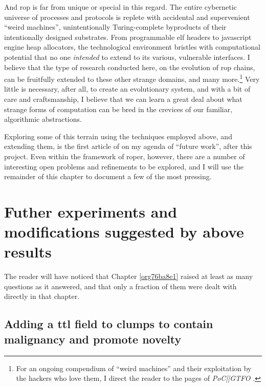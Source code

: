 \documentclass[12pt,glossary]{dalthesis}
\begin{document}
And \gls{rop} is far from unique or special in this regard. The entire cybernetic
universe of processes and protocols is replete with accidental and supervenient
``weird machines'', unintentionally Turing-complete byproducts of their intentionally
designed substrates. From programmable \gls{elf} headers to javascript engine heap
allocators, the technological environment bristles with computational potential
that no one \emph{intended} to extend to its various, vulnerable interfaces. I believe
that the type of research conducted here, on the evolution of \gls{rop} chains, can
be fruitfully extended to these other strange domains, and many more.\footnote{For an ongoing compendium of ``weird machines'' and their exploitation by the
  hackers who love them, I direct the reader to the pages of \emph{PoC||GTFO}
  \cite{pocorgtfo}.} Very little
is necessary, after all, to create an evolutionary system, and with a bit of care
and craftsmanship, I believe that we can learn a great deal about what strange
forms of computation can be bred in the crevices of our familiar, algorithmic
abstractions. 

Exploring some of this terrain using the techniques employed above, and
extending them, is the first article of on my agenda of ``future work'',
after this project. Even within the framework of \gls{roper}, however, there
are a number of interesting open problems and refinements to be explored,
and I will use the remainder of this chapter to document a few of the most
pressing.


\section{Futher experiments and modifications suggested by above results}
\label{sec:org2be0405}

The reader will have noticed that Chapter \ref{org76ba8e1} raised at least
as many questions as it answered, and that only a fraction of them were dealt
with directly in that chapter. 

\subsection{Adding a \gls{ttl} field to clumps to contain malignancy and promote novelty}
\label{sec:org184d5f8}
\end{document}
